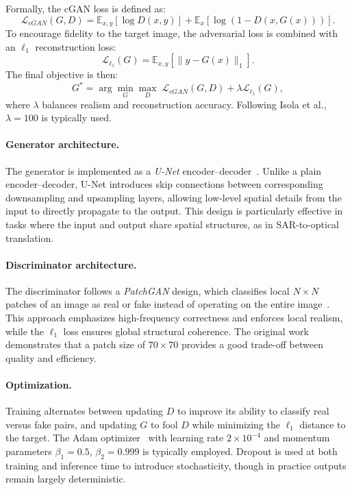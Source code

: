 Formally, the cGAN loss is defined as:
\begin{equation}
    \mathcal{L}_{cGAN}(G,D) = \mathbb{E}_{x,y}[\log D(x,y)] + \mathbb{E}_{x}[\log(1 - D(x,G(x)))].
\end{equation}
To encourage fidelity to the target image, the adversarial loss is combined with an $\ell_{1}$ reconstruction loss:
\begin{equation}
    \mathcal{L}_{\ell_1}(G) = \mathbb{E}_{x,y}[\|y - G(x)\|_1].
\end{equation}
The final objective is then:
\begin{equation}
    G^* = \arg \min_G \max_D \; \mathcal{L}_{cGAN}(G,D) + \lambda \mathcal{L}_{\ell_1}(G),
\end{equation}
where $\lambda$ balances realism and reconstruction accuracy. Following Isola et al., $\lambda = 100$ is typically used.

\paragraph{Generator architecture.}  
The generator is implemented as a \textit{U-Net} encoder–decoder~\cite{U-net_2015}. Unlike a plain encoder–decoder, U-Net introduces skip connections between corresponding downsampling and upsampling layers, allowing low-level spatial details from the input to directly propagate to the output. This design is particularly effective in tasks where the input and output share spatial structures, as in SAR-to-optical translation.

\paragraph{Discriminator architecture.}  
The discriminator follows a \textit{PatchGAN} design, which classifies local $N \times N$ patches of an image as real or fake instead of operating on the entire image~\cite{pix2pix_2018}. This approach emphasizes high-frequency correctness and enforces local realism, while the $\ell_1$ loss ensures global structural coherence. The original work demonstrates that a patch size of $70 \times 70$ provides a good trade-off between quality and efficiency.

\paragraph{Optimization.}  
Training alternates between updating $D$ to improve its ability to classify real versus fake pairs, and updating $G$ to fool $D$ while minimizing the $\ell_1$ distance to the target. The Adam optimizer~\cite{adam_optimizer_2017} with learning rate $2 \times 10^{-4}$ and momentum parameters $\beta_1=0.5$, $\beta_2=0.999$ is typically employed. Dropout is used at both training and inference time to introduce stochasticity, though in practice outputs remain largely deterministic.

